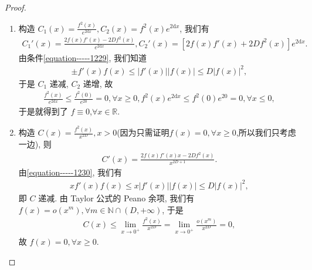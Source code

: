 \documentclass[../../main.tex]{subfiles}
\begin{document}
\begin{proof}
\begin{enumerate}
\item 构造 $C_1(x)=\frac{f^2(x)}{e^{2\mathrm{d}x}},C_2(x)=f^2(x)e^{2\mathrm{d}x}$, 我们有
\begin{align*}
C_1'(x)=\frac{2f(x)f'(x)-2Df^2(x)}{e^{2\mathrm{d}x}},C_2'(x)=[2f(x)f'(x)+2Df^2(x)]e^{2\mathrm{d}x}.
\end{align*}
由条件\eqref{equation-----1229}, 我们知道
\begin{align*}
\pm f'(x)f(x)\leqslant|f'(x)||f(x)|\leqslant D|f(x)|^2,
\end{align*}
于是 $C_1$ 递减, $C_2$ 递增, 故
\begin{align*}
\frac{f^2(x)}{e^{2\mathrm{d}x}}\leqslant\frac{f^2(0)}{e^{20}}=0,\forall x\geqslant0,f^2(x)e^{2\mathrm{d}x}\leqslant f^2(0)e^{20}=0,\forall x\leqslant0,
\end{align*}
于是就得到了 $f\equiv0$,$\forall x\in \mathbb{R}$.

\item 构造 $C(x)=\frac{f^2(x)}{x^{2D}},x>0$(因为只需证明$f(x)=0,\forall x\geqslant0$,所以我们只考虑一边), 则
\begin{align*}
C'(x)=\frac{2f(x)f'(x)x - 2Df^2(x)}{x^{2D + 1}}.
\end{align*}
由\eqref{equation-----1230}, 我们有
\begin{align*}
xf'(x)f(x)\leqslant x|f'(x)||f(x)|\leqslant D|f(x)|^2,
\end{align*}
即 $C$ 递减. 由 Taylor 公式的 Peano 余项, 我们有 $f(x)=o(x^m),\forall m\in\mathbb{N}\cap (D,+\infty)$, 于是 
\begin{align*}
C(x)\leqslant \lim_{x\rightarrow 0^+} \frac{f^2(x)}{x^{2D}}=\lim_{x\rightarrow 0^+} \frac{o\left( x^m \right)}{x^{2D}}=0,
\end{align*}
故 $f(x)=0,\forall x\geqslant0$. 
\end{enumerate}
\end{proof}
\end{document}
